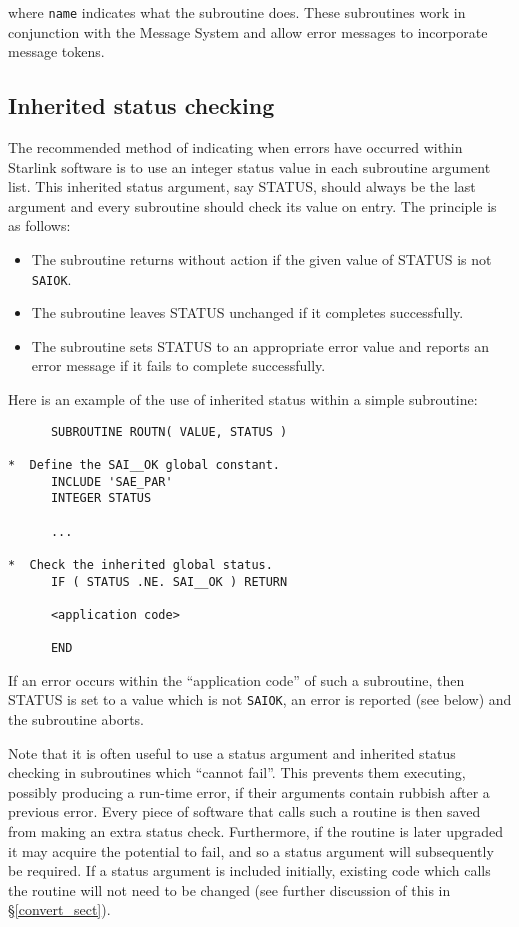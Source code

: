 \documentclass[twoside,11pt]{article}
\newcommand{\htmlref}[2]{#1}
\newcommand{\latex}[1]{#1}
\newcommand{\xlabel}[1]{}
\renewcommand{\_}{\texttt{\symbol{95}}}
\newcommand{\const}[1]{\texttt{#1}}
\newcommand{\saiok}{\const{SAI\_\_OK}}
\begin{document}
where \texttt{name} indicates what the subroutine does.
These subroutines work in conjunction with the Message System and allow error
messages to incorporate message tokens.


\subsection{\xlabel{inherited_status_checking}Inherited status checking
\label{inherited_status} \xlabel{inherited_status}}
The recommended method of indicating when errors have occurred within
Starlink software is to use an integer status value in each subroutine
argument list.
This inherited status argument, say STATUS, should always be the last
argument and every subroutine should check its value on entry.
The principle is as follows:

\begin {itemize}
\item The subroutine returns without action if the given value of STATUS is
not \saiok.

\item The subroutine leaves STATUS unchanged if it completes successfully.

\item The subroutine sets STATUS to an appropriate error value and reports an
error message if it fails to complete successfully.
\end {itemize}

Here is an example of the use of inherited status within a simple subroutine:

\begin {small}
\begin{verbatim}
      SUBROUTINE ROUTN( VALUE, STATUS )

*  Define the SAI__OK global constant.
      INCLUDE 'SAE_PAR'
      INTEGER STATUS

      ...

*  Check the inherited global status.
      IF ( STATUS .NE. SAI__OK ) RETURN

      <application code>

      END
\end{verbatim}
\end {small}

If an error occurs within the ``application code'' of such a subroutine, then
STATUS is set to a value which is not \saiok, an error is reported (see
below) and the subroutine aborts.

Note that it is often useful to use a status argument and inherited status
checking in subroutines which ``cannot fail''.
This prevents them executing, possibly producing a run-time error, if
their arguments contain rubbish after a previous error.
Every piece of software that calls such a routine is then saved from making
an extra status check.
Furthermore, if the routine is later upgraded it may acquire the potential
to fail, and so a status argument will subsequently be required.
If a status argument is included initially, existing code which calls
the routine will not need to be changed (see
\htmlref{further discussion}{convert_sect}
of this\latex{ in \S\ref{convert_sect}}).
\end{document}

